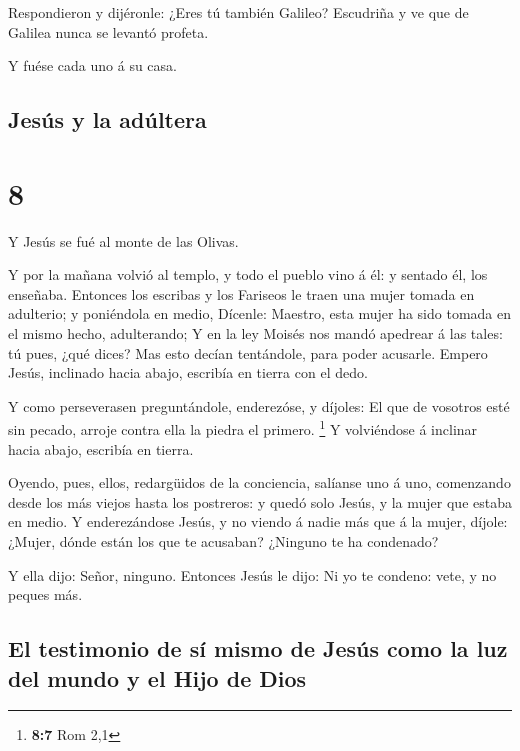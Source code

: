  Respondieron y dijéronle: ¿Eres tú también Galileo?
Escudriña y ve que de Galilea nunca se levantó profeta.

 Y fuése cada uno á su casa.

\hypertarget{jesuxfas-y-la-aduxfaltera}{%
\subsection{Jesús y la adúltera}\label{jesuxfas-y-la-aduxfaltera}}

\hypertarget{section-7}{%
\section{8}\label{section-7}}

 Y Jesús se fué al monte de las Olivas.

 Y por la mañana volvió al templo, y todo el pueblo vino á
él: y sentado él, los enseñaba.  Entonces los escribas y
los Fariseos le traen una mujer tomada en adulterio; y poniéndola en
medio,  Dícenle: Maestro, esta mujer ha sido tomada en el
mismo hecho, adulterando;  Y en la ley Moisés nos mandó
apedrear á las tales: tú pues, ¿qué dices?  Mas esto
decían tentándole, para poder acusarle. Empero Jesús, inclinado hacia
abajo, escribía en tierra con el dedo.

 Y como perseverasen preguntándole, enderezóse, y díjoles:
El que de vosotros esté sin pecado, arroje contra ella la piedra el
primero. \footnote{\textbf{8:7} Rom 2,1}  Y volviéndose á
inclinar hacia abajo, escribía en tierra.

 Oyendo, pues, ellos, redargüidos de la conciencia,
salíanse uno á uno, comenzando desde los más viejos hasta los postreros:
y quedó solo Jesús, y la mujer que estaba en medio.  Y
enderezándose Jesús, y no viendo á nadie más que á la mujer, díjole:
¿Mujer, dónde están los que te acusaban? ¿Ninguno te ha condenado?

 Y ella dijo: Señor, ninguno. Entonces Jesús le dijo: Ni
yo te condeno: vete, y no peques más.

\hypertarget{el-testimonio-de-suxed-mismo-de-jesuxfas-como-la-luz-del-mundo-y-el-hijo-de-dios}{%
\subsection{El testimonio de sí mismo de Jesús como la luz del mundo y
el Hijo de
Dios}\label{el-testimonio-de-suxed-mismo-de-jesuxfas-como-la-luz-del-mundo-y-el-hijo-de-dios}}


